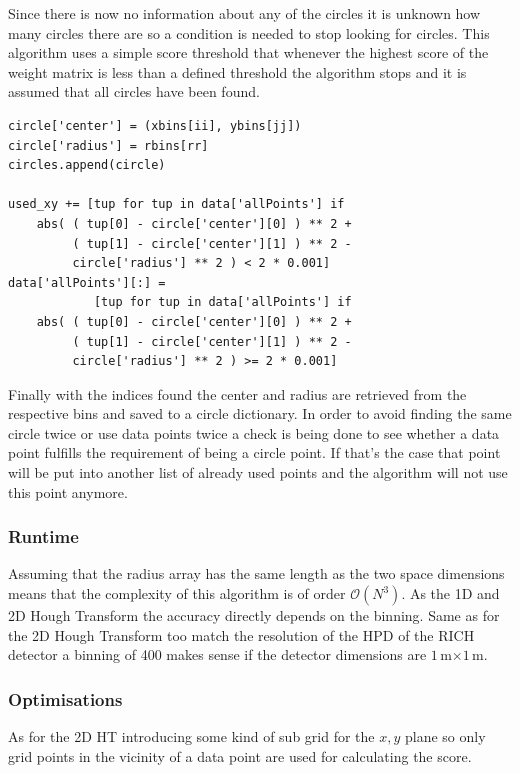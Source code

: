\documentclass[11pt,twoside]{scrreprt}
\begin{document}
Since there is now no information about any of the circles it is unknown how many circles there are so a condition is needed to stop looking for circles.
This algorithm uses a simple score threshold that whenever the highest score
of the weight matrix is less than a defined threshold the algorithm stops
and it is assumed that all circles have been found.
\begin{lstlisting}
circle['center'] = (xbins[ii], ybins[jj])
circle['radius'] = rbins[rr]
circles.append(circle)

used_xy += [tup for tup in data['allPoints'] if
    abs( ( tup[0] - circle['center'][0] ) ** 2 +
         ( tup[1] - circle['center'][1] ) ** 2 -
         circle['radius'] ** 2 ) < 2 * 0.001]
data['allPoints'][:] = 
            [tup for tup in data['allPoints'] if 
    abs( ( tup[0] - circle['center'][0] ) ** 2 + 
         ( tup[1] - circle['center'][1] ) ** 2 - 
         circle['radius'] ** 2 ) >= 2 * 0.001]  
\end{lstlisting}
Finally with the indices found the center and radius are retrieved
from the respective bins and saved to a circle dictionary. In order to
avoid finding the same circle twice or use data points twice a check
is being done to see whether a data point fulfills the requirement
of being a circle point. If that's the case that point will be put
into another list of already used points and the algorithm will not 
use this point anymore.
\subsubsection{Runtime} %
\label{ssub:runtime}
Assuming that the radius array has the same length as the two space
dimensions means that the complexity of this algorithm is of order 
$\mathcal{O}(N^3)$. As the 1D and 2D Hough Transform the accuracy
directly depends on the binning. Same as for the 2D Hough Transform
too match the resolution of the HPD of the RICH detector a binning of 400 makes sense if the detector dimensions are $1$\,m$\times1$\,m.

\subsubsection{Optimisations} %
\label{ssub:optimisations}
As for the 2D HT introducing some kind of sub grid for the $x,y$ 
plane so only grid points in the vicinity of a data point are used
for calculating the score.
\end{document}
